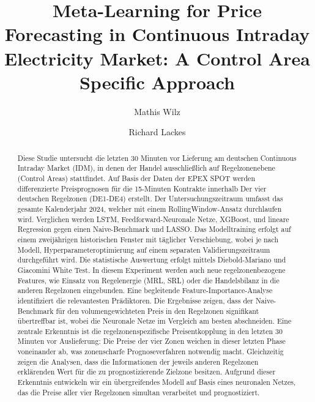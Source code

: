 \documentclass[preprint,12pt,nonatbib]{elsarticle}
\begin{document}
\begin{frontmatter}

\title{Meta-Learning for Price Forecasting in Continuous Intraday Electricity Market: A Control Area Specific Approach}

\author[inst1]{Mathis Wilz}
\author[inst2]{Richard Lackes}




\begin{abstract}
Diese Studie untersucht die letzten 30 Minuten vor Lieferung am deutschen Continuous Intraday Market (IDM), in denen der Handel ausschließlich auf Regelzonenebene (Control Areas) stattfindet.
Auf Basis der Daten der EPEX SPOT werden differenzierte Preisprognosen für die 15-Minuten Kontrakte innerhalb Der vier deutschen Regelzonen (DE1-DE4) erstellt.
Der Untersuchungszeitraum umfasst das gesamte Kalenderjahr 2024, welcher mit einem RollingWindow-Ansatz durchlaufen wird.
Verglichen werden LSTM, Feedforward-Neuronale Netze, XGBoost, und lineare Regression gegen einen Naive-Benchmark und LASSO.
Das Modelltraining erfolgt auf einem zweijährigen historischen Fenster mit täglicher Verschiebung, wobei je nach Modell, Hyperparameteroptimierung auf einem separaten Validierungszeitraum durchgeführt wird.
Die statistische Auswertung erfolgt mittels Diebold-Mariano und Giacomini White Test. In diesem Experiment werden auch neue regelzonenbezogene Features, wie Einsatz von Regelenergie (MRL, SRL) oder die Handelsbilanz in die anderen Regelzonen eingebunden.
Eine begleitende Feature-Importance-Analyse identifiziert die relevantesten Prädiktoren.
Die Ergebnisse zeigen, dass der Naive-Benchmark für den volumengewichteten Preis in den Regelzonen signifikant übertreffbar ist, wobei die Neuronale Netze im Vergleich am besten abschneiden.
Eine zentrale Erkenntnis ist die regelzonenspezifische Preisentkopplung in den letzten 30 Minuten vor Auslieferung: Die Preise der vier Zonen weichen in dieser letzten Phase voneinander ab, was zonenscharfe Prognoseverfahren notwendig macht.
Gleichzeitig zeigen die Analysen, dass die Informationen der jeweils anderen Regelzonen erklärenden Wert für die zu prognostizierende Zielzone besitzen.
Aufgrund dieser Erkenntnis entwickeln wir ein übergreifendes Modell auf Basis eines neuronalen Netzes, das die Preise aller vier Regelzonen simultan verarbeitet und prognostiziert.
\end{abstract}


\end{frontmatter}
\end{document}
